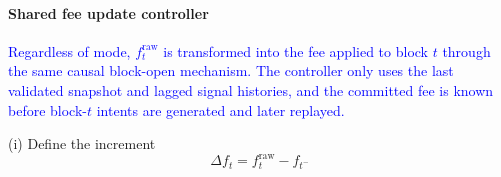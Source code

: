 \documentclass[11pt]{article}
\begin{document}

\paragraph{Shared fee update controller}
\textcolor{blue}{Regardless of mode, $f^{\mathrm{raw}}_t$ is transformed into the fee applied to block $t$ through the same causal block-open mechanism. The controller only uses the last validated snapshot and lagged signal histories, and the committed fee is known before block-$t$ intents are generated and later replayed.}

(i) Define the increment
\begin{equation}
  \Delta f_t = f^{\mathrm{raw}}_t - f_{t^-}
\end{equation}
\end{document}
